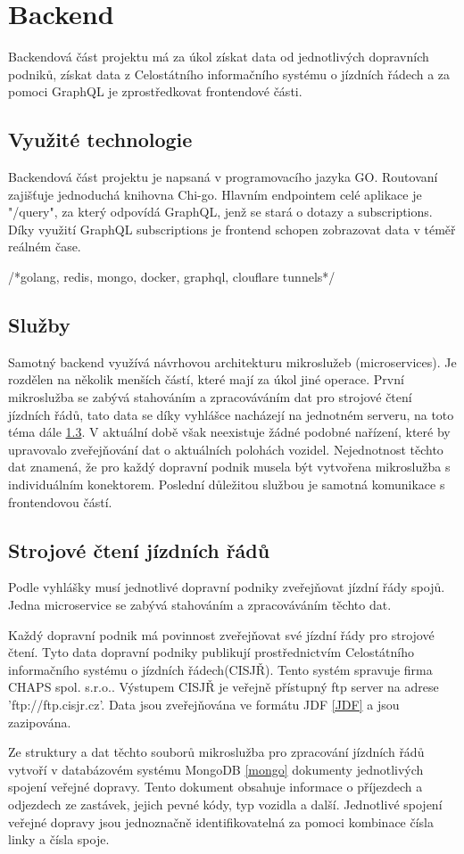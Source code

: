 
\section{Backend}
Backendová část projektu má za úkol získat data od jednotlivých dopravních podniků, získat data z Celostátního informačního systému o jízdních řádech\cite{cisjr} a za pomoci GraphQL je zprostředkovat frontendové části.
\subsection{Využité technologie}
Backendová část projektu je napsaná v programovacího jazyka GO. Routovaní zajišťuje jednoduchá knihovna Chi-go. Hlavním endpointem celé aplikace je "/query", za který odpovídá GraphQL, jenž se stará o dotazy a subscriptions. Díky využití GraphQL subscriptions je frontend schopen zobrazovat data v téměř reálném čase.\par

/*golang, redis, mongo, docker, graphql, clouflare tunnels*/
\subsection{Služby}
Samotný backend využívá návrhovou architekturu mikroslužeb (microservices). Je rozdělen na několik menších částí, které mají za úkol jiné operace. První mikroslužba se zabývá stahováním a zpracováváním dat pro strojové čtení jízdních řádů, tato data se díky vyhlášce\cite{vyhlaskaJizdniRady} nacházejí na jednotném serveru, na toto téma dále \ref{strojoveCteniJR}. V aktuální době však neexistuje žádné podobné nařízení, které by upravovalo zveřejňování dat o aktuálních polohách vozidel. Nejednotnost těchto dat znamená, že pro každý dopravní podnik musela být vytvořena mikroslužba s individuálním konektorem. Poslední důležitou službou je samotná komunikace s frontendovou částí.
\subsection [Jízdní řády]{Strojové čtení jízdních řádů} \label{strojoveCteniJR}
Podle vyhlášky\cite{vyhlaskaJizdniRady} musí jednotlivé dopravní podniky zveřejňovat jízdní řády spojů. Jedna microservice se zabývá stahováním a zpracováváním těchto dat. \par
Každý dopravní podnik má povinnost zveřejňovat své jízdní řády pro strojové čtení. Tyto data dopravní podniky publikují prostřednictvím Celostátního informačního systému o jízdních řádech(CISJŘ)\cite{cisjr}. Tento systém spravuje firma CHAPS spol. s.r.o.\cite{chaps}. Výstupem CISJŘ je veřejně přístupný ftp server na adrese 'ftp://ftp.cisjr.cz'. Data jsou zveřejňována ve formátu JDF \ref{JDF} a jsou zazipována. \par
Ze struktury a dat těchto souborů mikroslužba pro zpracování jízdních řádů vytvoří v databázovém systému MongoDB \ref{mongo} dokumenty jednotlivých spojení veřejné dopravy. Tento dokument obsahuje informace o příjezdech a odjezdech ze zastávek, jejich pevné kódy, typ vozidla a další. Jednotlivé spojení veřejné dopravy jsou jednoznačně identifikovatelná za pomoci kombinace čísla linky a čísla spoje.
